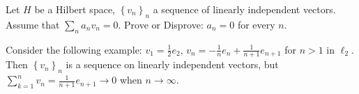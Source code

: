 \documentclass[11pt]{article} %
\begin{document}
\begin{Exercise}
Let $H$ be a Hilbert space, $\left\{v_n\right\}_n$ a sequence of linearly independent vectors. Assume that $\sum_na_n v_n= 0$. Prove or Disprove: $a_n= 0$ for every $n$.
\end{Exercise}

\begin{Answer}
Consider the following example: $v_1 = \frac{1}{2}e_2$, $v_n = -\frac{1}{n}e_n + \frac{1}{n+1}e_{n+1}$ for $n>1$ in $\ell_2$. Then $\left\{v_n\right\}_n$ is a sequence on linearly independent vectors, but $\sum_{k=1}^{n}v_n = \frac{1}{n+1}e_{n+1} \to 0$ when $n\to \infty$.
\end{Answer}
\end{document}
